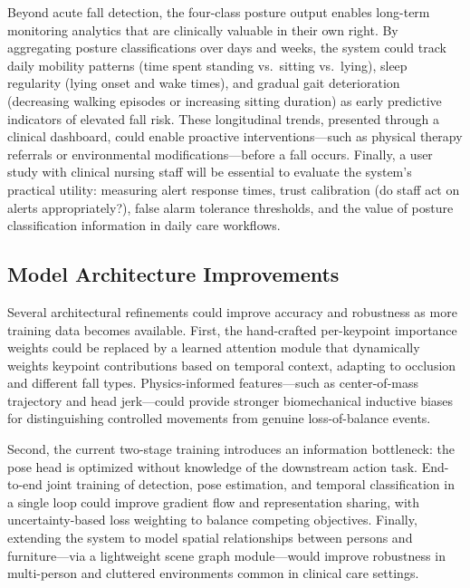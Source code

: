Beyond acute fall detection, the four-class posture output enables long-term monitoring analytics that are clinically valuable in their own right. By aggregating posture classifications over days and weeks, the system could track daily mobility patterns (time spent standing vs.\ sitting vs.\ lying), sleep regularity (lying onset and wake times), and gradual gait deterioration (decreasing walking episodes or increasing sitting duration) as early predictive indicators of elevated fall risk. These longitudinal trends, presented through a clinical dashboard, could enable proactive interventions---such as physical therapy referrals or environmental modifications---before a fall occurs. Finally, a user study with clinical nursing staff will be essential to evaluate the system's practical utility: measuring alert response times, trust calibration (do staff act on alerts appropriately?), false alarm tolerance thresholds, and the value of posture classification information in daily care workflows.

\subsection{Model Architecture Improvements}
\label{sec:outlook_architecture}

Several architectural refinements could improve accuracy and robustness as more training data becomes available. First, the hand-crafted per-keypoint importance weights could be replaced by a learned attention module that dynamically weights keypoint contributions based on temporal context, adapting to occlusion and different fall types. Physics-informed features---such as center-of-mass trajectory and head jerk---could provide stronger biomechanical inductive biases for distinguishing controlled movements from genuine loss-of-balance events.

Second, the current two-stage training introduces an information bottleneck: the pose head is optimized without knowledge of the downstream action task. End-to-end joint training of detection, pose estimation, and temporal classification in a single loop could improve gradient flow and representation sharing, with uncertainty-based loss weighting to balance competing objectives. Finally, extending the system to model spatial relationships between persons and furniture---via a lightweight scene graph module---would improve robustness in multi-person and cluttered environments common in clinical care settings.